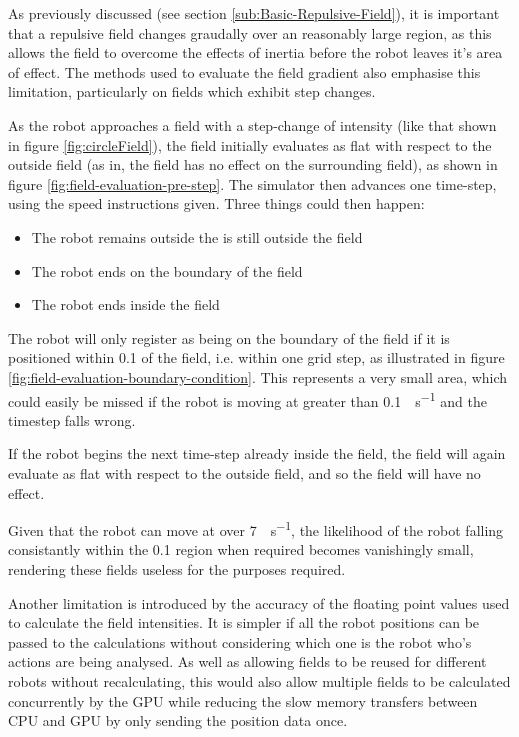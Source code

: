 \documentclass[10pt]{article} \usepackage[a4paper]{geometry}
\begin{document}
As previously discussed (see section \ref{sub:Basic-Repulsive-Field}), it is
important that a repulsive field changes graudally over an reasonably large
region, as this allows the field to overcome the effects of inertia before the
robot leaves it's area of effect.  The methods used to evaluate the field
gradient also emphasise this limitation, particularly on fields which exhibit
step changes.

As the robot approaches a field with a step-change of intensity (like that
shown in figure \ref{fig:circleField}), the field initially evaluates as flat
with respect to the outside field (as in, the field has no effect on the
surrounding field), as shown in figure \ref{fig:field-evaluation-pre-step}.  The simulator then advances one time-step,
using the speed instructions given.  Three things could then happen:

\begin{itemize}
  \item The robot remains outside the is still outside the field
  \item The robot ends on the boundary of the field
  \item The robot ends inside the field
\end{itemize}

The robot will only register as being on the boundary of the field if it is
positioned within \SI{0.1}{\inch} of the field, i.e. within one grid step, as
illustrated in figure \ref{fig:field-evaluation-boundary-condition}.  This
represents a very small area, which could easily be missed if the robot is
moving at greater than \SI{0.1}{\inch\per\second} and the timestep falls wrong.

If the robot begins the next time-step already inside the field, the field will
again evaluate as flat with respect to the outside field, and so the field will
have no effect.

Given that the robot can move at over \SI{7}{\inch\per\second}, the likelihood
of the robot falling consistantly within the \SI{0.1}{\inch} region when
required becomes vanishingly small, rendering these fields useless for the
purposes required.

Another limitation is introduced by the accuracy of the floating point values
used to calculate the field intensities.  It is simpler if all the robot
positions can be passed to the calculations without considering which one is the
robot who's actions are being analysed.  As well as allowing fields to be reused
for different robots without recalculating, this would also allow multiple
fields to be calculated concurrently by the \ac{GPU} while reducing the slow
memory transfers between \ac{CPU} and \ac{GPU} by only sending the position data
once.
\end{document}
